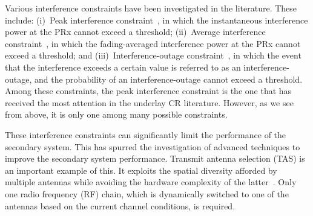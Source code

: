 \documentclass[12pt,draftcls,peerreview,onecolumn]{IEEEtran}
\begin{document}
Various interference constraints have been investigated in the literature. These include: (i)~Peak interference constraint~\cite{Fakhan_2014_TSP,Hanif_2015_globecom,Wang_2010_TWC,RZhang_2009_TWC,Suraweera_2010_TVT,li_2011_pimrc}, in which  the instantaneous interference power at the PRx cannot exceed  a threshold; (ii)~Average interference constraint~\cite{ Sarvendranath_2013_TCOM,Sarvendranath_2014_TCOM,Wang_2011_TCom}, in which  the fading-averaged interference power at the PRx  cannot exceed  a threshold;  and (iii)~Interference-outage constraint~\cite{Kashyap_2014_TCOM,Sboui_2013_TWC}, in which the event that the interference exceeds a certain value is referred to as an interference-outage, and the probability of an interference-outage cannot exceed a threshold. Among these constraints, the peak interference constraint is the one that has received the most attention in the underlay CR literature. However, as we see from above, it is only one among many possible constraints. 

These interference constraints can significantly limit the performance of the secondary system. This has spurred the investigation of advanced techniques to improve the secondary system performance. Transmit antenna selection (TAS) is an important example of this. It exploits the spatial diversity afforded by multiple antennas while avoiding the hardware complexity of the latter~\cite{mehta_2012_ComMag}. Only one radio frequency (RF) chain, which is dynamically switched to one of the antennas based on the current channel conditions, is required. 
\end{document}
